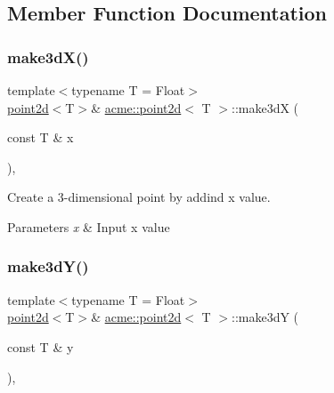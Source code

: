 \subsection{Member Function Documentation}
\mbox{\label{classacme_1_1point2d_a23948fcd0635557e8eeb0c298bb96f68}} 
\subsubsection{\texorpdfstring{make3d\+X()}{make3dX()}}
{\footnotesize\ttfamily template$<$typename T = Float$>$ \\
\hyperlink{classacme_1_1point2d}{point2d}$<$T$>$\& \hyperlink{classacme_1_1point2d}{acme\+::point2d}$<$ T $>$\+::make3dX (\begin{DoxyParamCaption}\item[{const T \&}]{x }\end{DoxyParamCaption})\hspace{0.3cm}{\ttfamily [inline]}, {\ttfamily [inherited]}}



Create a 3-\/dimensional point by addind x value. 


\begin{DoxyParams}{Parameters}
{\em x} & Input x value \\
\hline
\end{DoxyParams}
\mbox{\label{classacme_1_1point2d_ac6bdbcec56da64ea0265691f3e734625}} 
\subsubsection{\texorpdfstring{make3d\+Y()}{make3dY()}}
{\footnotesize\ttfamily template$<$typename T = Float$>$ \\
\hyperlink{classacme_1_1point2d}{point2d}$<$T$>$\& \hyperlink{classacme_1_1point2d}{acme\+::point2d}$<$ T $>$\+::make3dY (\begin{DoxyParamCaption}\item[{const T \&}]{y }\end{DoxyParamCaption})\hspace{0.3cm}{\ttfamily [inline]}, {\ttfamily [inherited]}}



